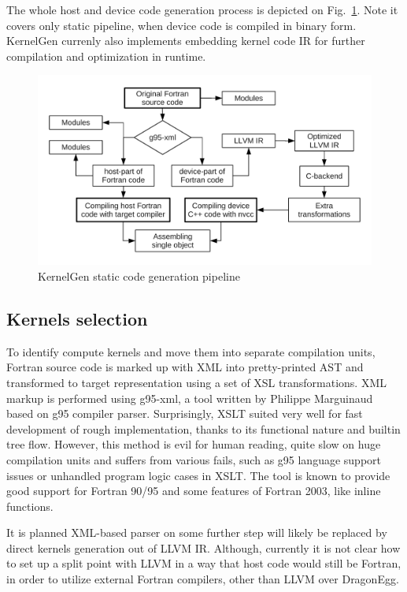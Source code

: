 \documentclass[a4,12pt]{article}
\begin{document}
The whole host and device code generation process is depicted on Fig.~\ref{fig:pipeline}. Note it covers only static pipeline, when device code is compiled in binary form. KernelGen currenly also implements embedding kernel code IR for further compilation and optimization in runtime.

\begin{figure}
\centering
\includegraphics[scale=0.5]{figures/pipeline.pdf}
\caption{KernelGen static code generation pipeline}
\label{fig:pipeline}
\end{figure}

\subsection{Kernels selection}

To identify compute kernels and move them into separate compilation units, Fortran source code is marked up with XML into pretty-printed AST and transformed to target representation using a set of XSL transformations. XML markup is performed using g95-xml, a tool written by Philippe Marguinaud based on g95 compiler parser. Surprisingly, XSLT suited very well for fast development of rough implementation, thanks to its functional nature and builtin tree flow. However, this method is evil for human reading, quite slow on huge compilation units and suffers from various fails, such as g95 language support issues or unhandled program logic cases in XSLT. The tool is known to provide good support for Fortran 90/95 and some features of Fortran 2003, like inline functions.

It is planned XML-based parser on some further step will likely be replaced by direct kernels generation out of LLVM IR. Although, currently it is not clear how to set up a split point with LLVM in a way that host code would still be Fortran, in order to utilize external Fortran compilers, other than LLVM over DragonEgg.
\end{document}
